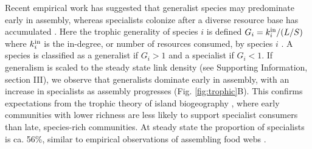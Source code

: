 \documentclass[twocolumn,preprintnumbers,amsmath,amssymb,superscriptaddress]{revtex4}
\newcommand{\rr}[1]{{\rm #1}}
\begin{document}
% 




Recent empirical work has suggested that generalist species may predominate early in assembly, whereas specialists colonize after a diverse resource base has accumulated \cite{Piechnik2008,Gravel2011}.
Here the trophic generality of species $i$ is defined $G_i = k^{\rm in}_i/(L/S)$ where $k^{\rm in}_i$ is the in-degree, or number of resources consumed, by species $i$ \cite{Williams2000}.
A species is classified as a generalist if $G_i > 1$ and a specialist if $G_i < 1$.
If generalism is scaled to the steady state link density (see Supporting Information, section III), we observe that generalists dominate early in assembly, with an increase in specialists as assembly progresses (Fig. \ref{fig:trophic}B).
This confirms expectations from the trophic theory of island biogeography \cite{Gravel2011}, where early communities with lower richness are less likely to support specialist consumers than late, species-rich communities.
At steady state the proportion of specialists is ca. 56\%, similar to empirical observations of assembling food webs \cite{Piechnik2008}.
\end{document}
